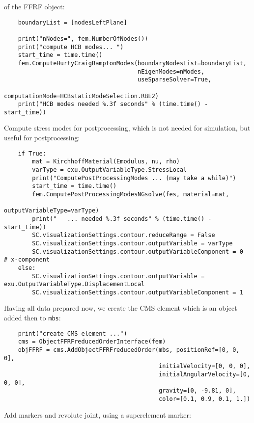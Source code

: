of the FFRF object:
\pythonstyle\begin{lstlisting}
    boundaryList = [nodesLeftPlane]

    print("nNodes=", fem.NumberOfNodes())
    print("compute HCB modes... ")
    start_time = time.time()
    fem.ComputeHurtyCraigBamptonModes(boundaryNodesList=boundaryList, 
                                      nEigenModes=nModes, 
                                      useSparseSolver=True,
                                      computationMode=HCBstaticModeSelection.RBE2)
    print("HCB modes needed %.3f seconds" % (time.time() - start_time))
\end{lstlisting}
%
Compute stress modes for postprocessing, which is not needed for simulation, but useful for postprocessing:
\pythonstyle\begin{lstlisting}
    if True:
        mat = KirchhoffMaterial(Emodulus, nu, rho)
        varType = exu.OutputVariableType.StressLocal
        print("ComputePostProcessingModes ... (may take a while)")
        start_time = time.time()
        fem.ComputePostProcessingModesNGsolve(fes, material=mat,
                                              outputVariableType=varType)
        print("   ... needed %.3f seconds" % (time.time() - start_time))
        SC.visualizationSettings.contour.reduceRange = False
        SC.visualizationSettings.contour.outputVariable = varType
        SC.visualizationSettings.contour.outputVariableComponent = 0  # x-component
    else:
        SC.visualizationSettings.contour.outputVariable = exu.OutputVariableType.DisplacementLocal
        SC.visualizationSettings.contour.outputVariableComponent = 1 
\end{lstlisting}
%
Having all data prepared now, we create the CMS element which is an object added then to \texttt{mbs}:
\pythonstyle\begin{lstlisting}
    print("create CMS element ...")
    cms = ObjectFFRFreducedOrderInterface(fem)
    objFFRF = cms.AddObjectFFRFreducedOrder(mbs, positionRef=[0, 0, 0], 
                                            initialVelocity=[0, 0, 0], 
                                            initialAngularVelocity=[0, 0, 0],
                                            gravity=[0, -9.81, 0],
                                            color=[0.1, 0.9, 0.1, 1.])
\end{lstlisting}
%
Add markers and revolute joint, using a superelement marker:
